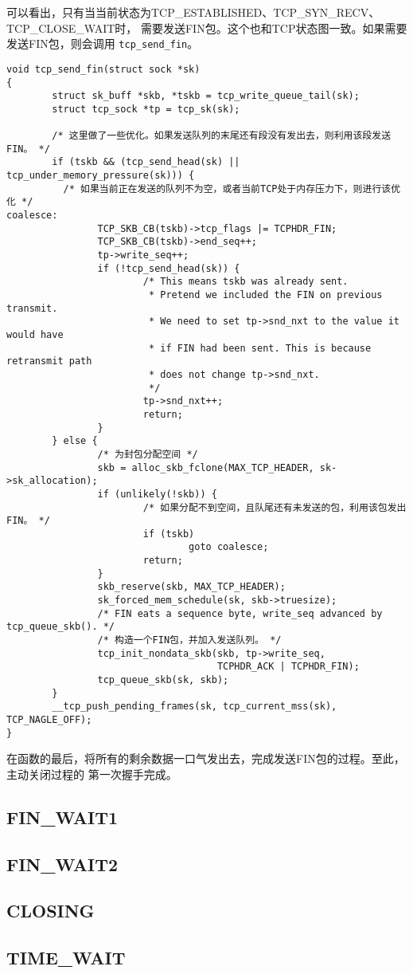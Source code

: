 可以看出，只有当当前状态为TCP\_ESTABLISHED、TCP\_SYN\_RECV、TCP\_CLOSE\_WAIT时，
需要发送FIN包。这个也和TCP状态图一致。如果需要发送FIN包，则会调用
\texttt{tcp_send_fin}。
\begin{verbatim}
void tcp_send_fin(struct sock *sk)
{
        struct sk_buff *skb, *tskb = tcp_write_queue_tail(sk);
        struct tcp_sock *tp = tcp_sk(sk);

        /* 这里做了一些优化。如果发送队列的末尾还有段没有发出去，则利用该段发送FIN。 */
        if (tskb && (tcp_send_head(sk) || tcp_under_memory_pressure(sk))) {
          /* 如果当前正在发送的队列不为空，或者当前TCP处于内存压力下，则进行该优化 */
coalesce:
                TCP_SKB_CB(tskb)->tcp_flags |= TCPHDR_FIN;
                TCP_SKB_CB(tskb)->end_seq++;
                tp->write_seq++;
                if (!tcp_send_head(sk)) {
                        /* This means tskb was already sent.
                         * Pretend we included the FIN on previous transmit.
                         * We need to set tp->snd_nxt to the value it would have
                         * if FIN had been sent. This is because retransmit path
                         * does not change tp->snd_nxt.
                         */
                        tp->snd_nxt++;
                        return;
                }
        } else {
                /* 为封包分配空间 */
                skb = alloc_skb_fclone(MAX_TCP_HEADER, sk->sk_allocation);
                if (unlikely(!skb)) {
                        /* 如果分配不到空间，且队尾还有未发送的包，利用该包发出FIN。 */
                        if (tskb)
                                goto coalesce;
                        return;
                }
                skb_reserve(skb, MAX_TCP_HEADER);
                sk_forced_mem_schedule(sk, skb->truesize);
                /* FIN eats a sequence byte, write_seq advanced by tcp_queue_skb(). */
                /* 构造一个FIN包，并加入发送队列。 */
                tcp_init_nondata_skb(skb, tp->write_seq,
                                     TCPHDR_ACK | TCPHDR_FIN);
                tcp_queue_skb(sk, skb);
        }
        __tcp_push_pending_frames(sk, tcp_current_mss(sk), TCP_NAGLE_OFF);
}
\end{verbatim}
在函数的最后，将所有的剩余数据一口气发出去，完成发送FIN包的过程。至此，主动关闭过程的
第一次握手完成。

\subsection{FIN\_WAIT1}

\subsection{FIN\_WAIT2}

\subsection{CLOSING}

\subsection{TIME\_WAIT}
